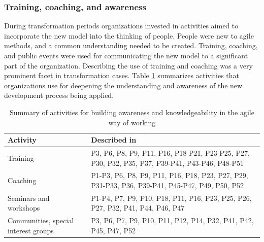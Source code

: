 \documentclass[preprint,authoryear,12pt]{elsarticle}
\begin{document}
\subsubsection{Training, coaching, and awareness}

During transformation periods organizations invested in activities aimed to
incorporate the new model into the thinking of people. People were new to agile
methods, and a common understanding needed to be created. Training, coaching,
and public events were used for communicating the new model to a significant
part of the organization. Describing the use of training and coaching was a very
prominent facet in transformation cases.
Table \ref{table:transformation_training} summarizes activities that
organizations use for deepening the understanding and awareness of the new
development process being applied.

\begin{table}[h]
    \centering
    \begin{tabular}{ >{\raggedright\arraybackslash}p{}
                     >{\raggedright\arraybackslash}p{} }
        \toprule
        Activity           &  Described in  \\
        \midrule
        Training    &
                P3, P6, P8, P9, P11, P16, P18-P21, P23-P25, P27, P30,
                P32, P35, P37, P39-P41, P43-P46, P48-P51  \\  %
        Coaching    &
                P1-P3, P6, P8, P9, P11, P16, P18, P23, P27, P29,
                P31-P33, P36, P39-P41, P45-P47, P49, P50, P52  \\  %
        Seminars and workshops   &
                P1-P4, P7, P9, P10, P18, P11, P16, P23, P25,
                P26, P27, P32, P41, P44, P46, P47   \\   %
        Communities, special interest groups  &
                P3, P6, P7, P9, P10, P11, P12, P14, P32, P41,
                P42, P45, P47, P52  \\   %
        \bottomrule
    \end{tabular}
    \caption{Summary of activities for building awareness and knowledgeability
             in the agile way of working}
    \label{table:transformation_training}
\end{table}
\end{document}
